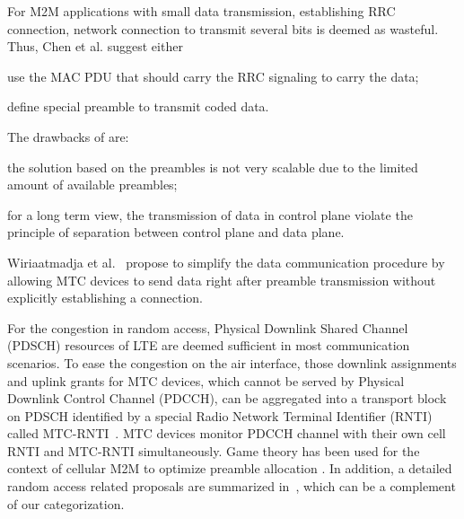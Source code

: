 For M2M applications with small data transmission, establishing RRC connection, network connection to transmit several bits is deemed as wasteful. Thus, Chen et al. \cite{ChenY10machine} suggest either \begin{inparaenum}[i)]
	\item use the MAC PDU that should carry the RRC signaling to carry the data;
	\item define special preamble to transmit coded data.
\end{inparaenum}
The drawbacks of \cite{ChenY10machine} are:\begin{inparaenum}[i)]
	\item the solution based on the preambles is not very scalable due to the limited amount of available preambles;
	\item for a long term view, the transmission of data in control plane violate the principle of separation between control plane and data plane. 
\end{inparaenum} 
Wiriaatmadja et al.~\cite{wiriaatmadja2015hybrid} propose to simplify the data communication procedure by allowing MTC devices to send data right after preamble transmission without explicitly establishing a connection.

For the congestion in random access, Physical Downlink Shared Channel (PDSCH) resources of LTE are deemed sufficient in most communication scenarios. To ease the congestion on the air interface, those downlink assignments and uplink grants for MTC devices, which cannot be served by Physical Downlink Control Channel (PDCCH), can be aggregated into a transport block on PDSCH identified by a special  Radio Network Terminal Identifier (RNTI) called MTC-RNTI~\cite{transaction/yang13}. MTC devices monitor PDCCH channel with their own cell RNTI and MTC-RNTI simultaneously. Game theory has been used for the context of cellular M2M to optimize preamble allocation \cite{MHasan13}. In addition, a detailed random access related proposals are summarized in~\cite{laya14}, which can be a complement of our categorization.

